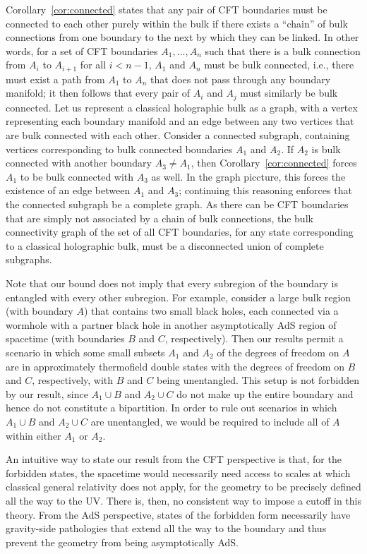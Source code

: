 \documentclass[12pt,english]{article}
\begin{document}
Corollary~\ref{cor:connected} states that any pair of CFT boundaries must be connected to each other purely within the bulk if there exists a ``chain'' of bulk connections from one boundary to the next by which they can be linked. In other words, for a set of CFT boundaries $A_1,\ldots,A_n$ such that there is a bulk connection from $A_i$ to $A_{i+1}$ for all $i<n-1$, $A_1$ and $A_n$ must be bulk connected, i.e., there must exist a path from $A_1$ to $A_n$ that does not pass through any boundary manifold; it then follows that every pair of $A_i$ and $A_j$ must similarly be bulk connected. Let us represent a classical holographic bulk as a graph, with a vertex representing each boundary manifold and an edge between any two vertices that are bulk connected with each other. Consider a connected subgraph, containing vertices corresponding to bulk connected boundaries $A_1$ and $A_2$. If $A_2$ is bulk connected with another boundary $A_3 \neq A_1$, then Corollary~\ref{cor:connected} forces $A_1$ to be bulk connected with $A_3$ as well. In the graph piccture, this forces the existence of an edge between $A_1$ and $A_3$; continuing this reasoning enforces that the connected subgraph be a complete graph. As there can be CFT boundaries that are simply not associated by a chain of bulk connections, the bulk connectivity graph of the set of all CFT boundaries, for any state corresponding to a classical holographic bulk, must be a disconnected union of complete subgraphs.

Note that our bound does not imply that every subregion of the boundary is entangled with every other subregion. For example, consider a large bulk region (with boundary $A$) that contains two small black holes, each connected via a wormhole with a partner black hole in another asymptotically AdS region of spacetime (with boundaries $B$ and $C$, respectively). Then our results permit a scenario in which some small subsets $A_1$ and $A_2$ of the degrees of freedom on $A$ are in approximately thermofield double states with the degrees of freedom on $B$ and $C$, respectively, with $B$ and $C$ being unentangled. This setup is not forbidden by our result, since $A_1 \cup B$ and $A_2 \cup C$ do not make up the entire boundary and hence do not constitute a bipartition. In order to rule out scenarios in which $A_1 \cup B$ and $A_2 \cup C$ are unentangled, we would be required to include all of $A$ within either $A_1$ or $A_2$.

An intuitive way to state our result from the CFT perspective is that, for the forbidden states, the spacetime would necessarily need access to scales at which classical general relativity does not apply, for the geometry to be precisely defined all the way to the UV. There is, then, no consistent way to impose a cutoff in this theory. From the AdS perspective, states of the forbidden form necessarily have gravity-side pathologies that extend all the way to the boundary and thus prevent the geometry from being asymptotically AdS.
\end{document}
